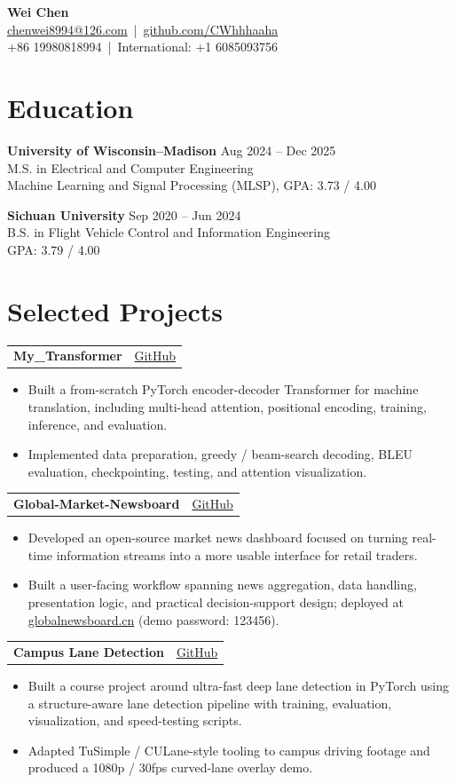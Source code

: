 \documentclass[10pt]{article}
\makeatletter
\newcommand{\resumesection}[1]{\section*{#1}}
\newcommand{\project}[2]{%
  \begin{tabularx}{\linewidth}{@{}Xr@{}}
    \textbf{#1} & #2
  \end{tabularx}\vspace{-0.45em}
}
\newcommand{\eduentry}[4]{
  \textbf{#1} \hfill #2\\
  #3\\
  #4
}
\makeatother
\begin{document}
\begin{center}
    {\LARGE \textbf{Wei Chen}}\\[0.2em]
    \href{mailto:chenwei8994@126.com}{chenwei8994@126.com} \,|\, \href{https://github.com/CWhhhaaha}{github.com/CWhhhaaha}\\
    +86 19980818994 \,|\, International: +1 6085093756
\end{center}

\resumesection{Education}

\eduentry
{University of Wisconsin--Madison}
{Aug 2024 -- Dec 2025}
{M.S. in Electrical and Computer Engineering}
{Machine Learning and Signal Processing (MLSP), GPA: 3.73 / 4.00}

\vspace{0.35em}

\eduentry
{Sichuan University}
{Sep 2020 -- Jun 2024}
{B.S. in Flight Vehicle Control and Information Engineering}
{GPA: 3.79 / 4.00}

\resumesection{Selected Projects}

\project{My\_Transformer}{\href{https://github.com/CWhhhaaha/My_Transformer}{GitHub}}
\begin{itemize}
    \item Built a from-scratch PyTorch encoder-decoder Transformer for machine translation, including multi-head attention, positional encoding, training, inference, and evaluation.
    \item Implemented data preparation, greedy / beam-search decoding, BLEU evaluation, checkpointing, testing, and attention visualization.
\end{itemize}

\project{Global-Market-Newsboard}{\href{https://github.com/CWhhhaaha/Global-Market-Newsboard}{GitHub}}
\begin{itemize}
    \item Developed an open-source market news dashboard focused on turning real-time information streams into a more usable interface for retail traders.
    \item Built a user-facing workflow spanning news aggregation, data handling, presentation logic, and practical decision-support design; deployed at \href{https://globalnewsboard.cn}{globalnewsboard.cn} (demo password: 123456).
\end{itemize}

\project{Campus Lane Detection}{\href{https://github.com/CWhhhaaha/539-Final-Project}{GitHub}}
\begin{itemize}
    \item Built a course project around ultra-fast deep lane detection in PyTorch using a structure-aware lane detection pipeline with training, evaluation, visualization, and speed-testing scripts.
    \item Adapted TuSimple / CULane-style tooling to campus driving footage and produced a 1080p / 30fps curved-lane overlay demo.
\end{itemize}
\end{document}
